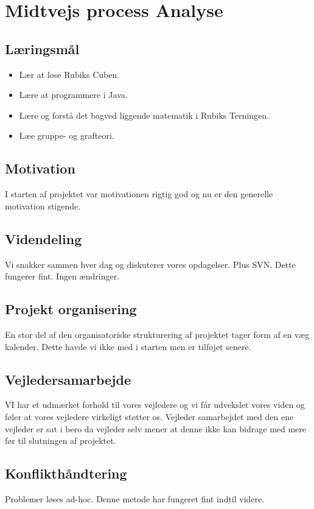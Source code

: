 \documentclass{report}
\begin{document}
\chapter{Midtvejs process Analyse}
\section{L\ae{}ringsm\aa{}l}
\begin{itemize}
\item L\ae{}r at l\o{}se Rubiks Cuben.
\item L\ae{}re at programmere i Java.
\item L\ae{}re  og forst\aa{} det bagved liggende matematik i Rubiks Terningen. 
\item L\ae{}e gruppe- og grafteori.
\end{itemize}

\section{Motivation}
I starten af projektet var motivationen rigtig god og nu er den generelle motivation stigende. 

\section{Videndeling}
Vi snakker sammen hver dag og diskuterer vores opdagelser. Plus SVN.
 Dette fungerer fint. Ingen \ae{}ndringer. 

\section{Projekt organisering}
En stor del af den organisatoriske strukturering af projektet tager form af en v\ae{}g kalender. Dette havde vi ikke med  i starten men er tilf\o{}jet senere. 

\section{Vejledersamarbejde}
VI har et udm\ae{}rket forhold til vores vejledere og vi f\aa{}r udvekslet vores viden og f\o{}ler at vores vejledere virkeligt st\o{}tter os. Vejleder samarbejdet med den ene vejleder er sat i bero da vejleder selv mener at denne ikke kan bidrage med mere f\o{}r til slutningen af projektet. 

\section{Konflikth\aa{}ndtering}
Problemer l\o{}ses ad-hoc. Denne metode har fungeret fint indtil videre.
\end{document}
